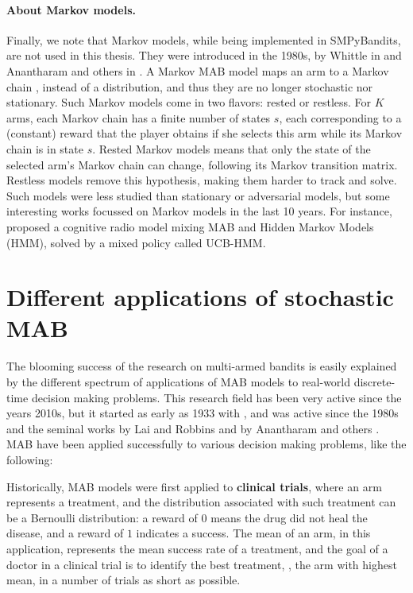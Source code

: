 \paragraph{About Markov models.}
%
Finally, we note that Markov models, while being implemented in SMPyBandits, are not used in this thesis.
They were introduced in the 1980s, by Whittle in \cite{Whittle1988} and Anantharam and others in \cite{Anantharam87b}.
A Markov MAB model maps an arm to a Markov chain \cite{Norris98}, instead of a distribution, and thus they are no longer stochastic nor stationary.
Such Markov models come in two flavors: rested or restless.
For $K$ arms, each Markov chain has a finite number of states $s$, each corresponding to a (constant) reward that the player obtains if she selects this arm while its Markov chain is in state $s$.
Rested Markov models means that only the state of the selected arm's Markov chain can change, following its Markov transition matrix.
Restless models remove this hypothesis, making them harder to track and solve.
%
Such models were less studied than stationary or adversarial models, but some interesting works focussed on Markov models in the last 10 years.
For instance, \cite{Melian15} proposed a cognitive radio model mixing MAB and Hidden Markov Models (HMM), solved by a mixed policy called UCB-HMM.


\section{Different applications of stochastic MAB}
\label{sec:2:applicationsofStochasticMAB}

The blooming success of the research on multi-armed bandits is easily explained by the different spectrum of applications of MAB models to real-world discrete-time decision making problems.
This research field has been very active since the years 2010s, but it started as early as 1933 with \cite{Thompson33}, and was active since the 1980s and the seminal works by Lai and Robbins \cite{LaiRobbins85} and by Anantharam and others \cite{Anantharam87a}.
%
MAB have been applied successfully to various decision making problems, like the following:

Historically, MAB models were first applied to \textbf{clinical trials}, where an arm represents a treatment, and the distribution associated with such treatment can be a Bernoulli distribution: a reward of $0$ means the drug did not heal the disease, and a reward of $1$ indicates a success. The mean of an arm, in this application, represents the mean success rate of a treatment, and the goal of a doctor in a clinical trial is to identify the best treatment, \ie, the arm with highest mean, in a number of trials as short as possible.
%

